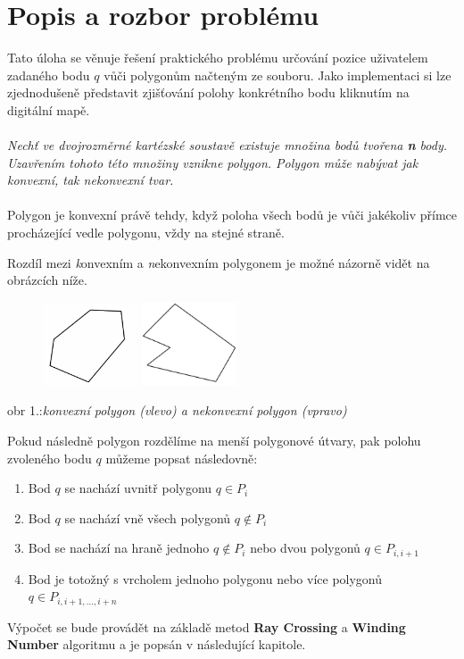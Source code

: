 \documentclass{article}
\begin{document}
\section{Popis a rozbor problému} %
\indent 
Tato úloha se věnuje řešení praktického problému určování pozice uživatelem zadaného bodu $q$ vůči polygonům načteným ze souboru. Jako implementaci si lze zjednodušeně představit zjišťování polohy konkrétního bodu kliknutím na digitální mapě. 
\\
\\
\textsl{Nechť ve dvojrozměrné kartézské soustavě existuje množina bodů tvořena \textbf n body. Uzavřením tohoto této množiny vznikne polygon. Polygon může nabývat jak konvexní, tak nekonvexní tvar.}
\\
\\
Polygon je konvexní právě tehdy, když poloha všech bodů je vůči jakékoliv přímce procházející vedle polygonu, vždy na stejné straně. 

Rozdíl mezi \textsl konvexním a  \textsl nekonvexním polygonem je možné názorně vidět na obrázcích níže.
\begin{figure}[htbp]
\centering
        \includegraphics[clip, trim=0cm 0cm 0cm 0cm, width=0.2500\textwidth]{obrazek1.png}
 \includegraphics[clip, trim=0cm 0cm 0cm 0cm, width=0.2500\textwidth]{obrazek2.png}
\end{figure}
\bigskip
\begin{center}
obr 1.:\textsl{konvexní polygon (vlevo) a nekonvexní polygon (vpravo)}
\end{center}
Pokud následně polygon rozdělíme na menší polygonové útvary, pak polohu zvoleného bodu $q$ můžeme popsat následovně: 
\begin{enumerate}
\item   Bod $q$ se nachází uvnitř polygonu  $q {\in} P_i$ 
\item   Bod $q$ se nachází vně všech polygonů  $q {\not \in} P_i$ 
\item   Bod se nachází na hraně jednoho  $q {\not \in} P_i$ nebo dvou polygonů $q {\in} P_{i,i+1}$ 
\item   Bod je totožný s vrcholem jednoho polygonu nebo více polygonů $q {\in} P_{i,i+1,...,i+n}$
\end{enumerate}
Výpočet se bude provádět na základě metod \textbf {Ray Crossing} a  \textbf {Winding Number} algoritmu a je popsán v následující kapitole.
\\
\clearpage
\end{document}
